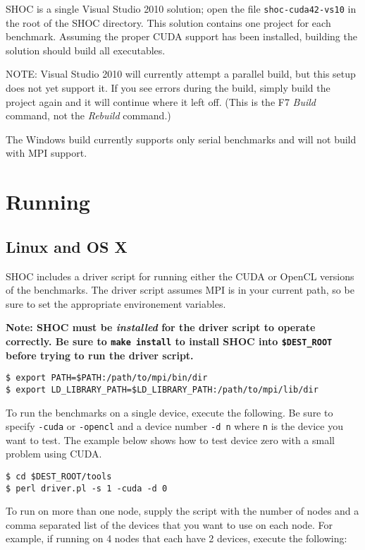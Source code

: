 \documentclass[11pt]{article}
\begin{document}
SHOC is a single Visual Studio 2010 solution; open
the file {\tt shoc-cuda42-vs10} in the root 
of the SHOC directory.  This solution contains
one project for each benchmark.  Assuming
the proper CUDA support has been installed,
building the solution should build all executables.

NOTE: Visual Studio 2010 will currently attempt
a parallel build, but this setup does not yet
support it.  If you see errors during the build,
simply build the project again and it will 
continue where it left off.  (This is
the F7 {\it Build} command, not the {\it Rebuild}
command.)

The Windows build currently supports only serial
benchmarks and will not build with MPI support.

\section{Running}\label{sec:running}

\subsection{Linux and OS X}

SHOC includes a driver script for running either the CUDA or OpenCL versions
of the benchmarks. The driver script assumes MPI is in your current path,
so be sure to set the appropriate environement variables.

{\bf Note: SHOC must be {\em installed} for the driver script to operate
correctly.  Be sure to \verb+make install+ to install SHOC into 
\verb+$DEST_ROOT+ before trying to run the driver script.}

\begin{Verbatim}[frame=single]
$ export PATH=$PATH:/path/to/mpi/bin/dir
$ export LD_LIBRARY_PATH=$LD_LIBRARY_PATH:/path/to/mpi/lib/dir
\end{Verbatim}

To run the benchmarks on a single device, execute the following. Be sure
to specify \verb+-cuda+ or \verb+-opencl+ and a device number \verb+-d n+
where \verb+n+ is the device you want to test. The example below shows how
to test device zero with a small problem using CUDA.

\begin{Verbatim}[frame=single]
$ cd $DEST_ROOT/tools
$ perl driver.pl -s 1 -cuda -d 0
\end{Verbatim}

To run on more than one node, supply the script with the number of nodes and 
a comma separated list of the devices that you want to use on each node. For
example, if running on 4 nodes that each have 2 devices, execute the following: 
\end{document}
